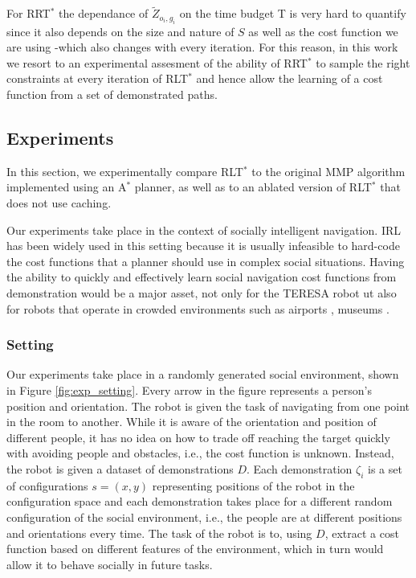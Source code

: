\documentclass[a4paper,11pt]{report}
\begin{document}


For RRT$^*$ the dependance of $\tilde{Z}_{o_i,g_i}$ on the time budget T is very hard to quantify since it also depends on the size and nature of $S$ as well as the cost function we are using -which also changes with every iteration. For this reason, in this work we resort to an experimental assesment of the ability of RRT$^*$ to sample the right constraints at every iteration of RLT$^*$ and hence allow the learning of a cost function from a set of demonstrated paths.


\subsection{Experiments}
In this section, we experimentally compare RLT$^*$ to the original MMP algorithm implemented using an A$^*$ planner, as well as to an ablated version of RLT$^*$ that does not use caching.
	
	Our experiments take place in the context of socially intelligent navigation. IRL has been widely used in this setting \cite{okallearning,henry2010learning,vasquez2014inverse} because it is usually infeasible to hard-code the cost functions that a planner should use in complex social situations. Having the ability to quickly and effectively learn social navigation cost functions from demonstration would be a major asset, not only for the TERESA robot ut also for robots that operate in crowded environments such as airports \cite{triebel2015spencer}, museums \cite{thrun1999minerva}.
	
\subsubsection{Setting}
	Our experiments take place in a randomly generated social environment, shown in Figure \ref{fig:exp_setting}. Every arrow in the figure represents a person's position and orientation. The robot is given the task of navigating from one point in the room to another. While it is aware of the orientation and position of different people, it has no idea on how to trade off reaching the target quickly with avoiding people and obstacles, i.e., the cost function is unknown. Instead, the robot is given a dataset of demonstrations $D$. Each demonstration $\zeta_i$ is a set of configurations $s = (x,y)$ representing positions of the robot in the configuration space and each demonstration takes place for a different random configuration of the social environment, i.e., the people are at different positions and orientations every time. The task of the robot is to, using $D$, extract a cost function based on different features of the environment, which in turn would allow it to behave socially in future tasks.
\end{document}
